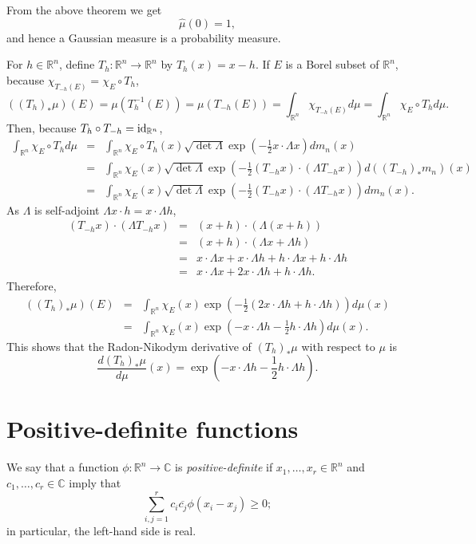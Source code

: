 \documentclass{article}
\newcommand{\id}{\ensuremath\mathrm{id}}
\theoremstyle{definition}
\begin{document}
From the above theorem we get 
\[
\hat{\mu}(0)=1,
\]
and hence a Gaussian measure is a probability measure.

For $h \in \mathbb{R}^n$, define $T_h:\mathbb{R}^n \to \mathbb{R}^n$ by $T_h(x)=x-h$. 
If $E$ is a Borel subset of $\mathbb{R}^n$, because $\chi_{T_{-h}(E)}=\chi_E \circ T_h$,
\[
((T_h)_* \mu) (E)=\mu(T_h^{-1}(E))=\mu(T_{-h}(E))=\int_{\mathbb{R}^n} \chi_{T_{-h}(E)} d\mu=
\int_{\mathbb{R}^n} \chi_E \circ T_h d\mu.
\]
Then, because $T_h \circ T_{-h} = \id_{\mathbb{R}^n}$, 
\begin{eqnarray*}
\int_{\mathbb{R}^n} \chi_E \circ T_h d\mu&=&\int_{\mathbb{R}^n}\chi_E \circ T_h (x)  \sqrt{\det \Lambda} \exp\left(-\frac{1}{2} x\cdot \Lambda x \right) dm_n(x)\\
&=&\int_{\mathbb{R}^n}\chi_E(x)  \sqrt{\det \Lambda} \exp\left(-\frac{1}{2} (T_{-h}x)\cdot (\Lambda T_{-h}x) \right) d((T_{-h})_*m_n)(x)\\
&=&\int_{\mathbb{R}^n}\chi_E(x)  \sqrt{\det \Lambda} \exp\left(-\frac{1}{2} (T_{-h}x)\cdot (\Lambda T_{-h}x) \right) dm_n(x).
\end{eqnarray*}
As $\Lambda$ is self-adjoint $\Lambda x\cdot  h =  x \cdot \Lambda h$,
\begin{eqnarray*}
(T_{-h}x)\cdot (\Lambda T_{-h}x)&=&(x+h)\cdot (\Lambda(x+h))\\
&=&(x+h)\cdot (\Lambda x + \Lambda h)\\
&=&x\cdot \Lambda x + x\cdot \Lambda h + h \cdot \Lambda x + h \cdot \Lambda h\\
&=&x\cdot \Lambda x + 2x\cdot \Lambda h + h \cdot \Lambda h.
\end{eqnarray*}
Therefore,
\begin{eqnarray*}
((T_h)_* \mu) (E) &=& \int_{\mathbb{R}^n} \chi_E(x) \exp\left(-\frac{1}{2}\left(2x\cdot \Lambda h + h \cdot \Lambda h\right)\right) d\mu(x)\\
&=&\int_{\mathbb{R}^n} \chi_E(x) \exp\left(-x\cdot \Lambda h -\frac{1}{2}h \cdot \Lambda h\right) d\mu(x).
\end{eqnarray*}
This shows that the Radon-Nikodym derivative of $(T_h)_*\mu$ with respect to $\mu$ is 
\[
\frac{d(T_h)_*\mu}{d\mu}(x) = \exp\left(-x\cdot \Lambda h -\frac{1}{2}h \cdot \Lambda h\right).
\]


\section{Positive-definite functions}
We say that a function $\phi:\mathbb{R}^n \to \mathbb{C}$ is {\em positive-definite}
if $x_1,\ldots,x_r \in \mathbb{R}^n$ and $c_1,\ldots,c_r \in
\mathbb{C}$ imply
that
\[
\sum_{i,j=1}^r c_i \overline{c_j} \phi(x_i-x_j) \geq 0;
\]
in particular, the left-hand side is real.
\end{document}
